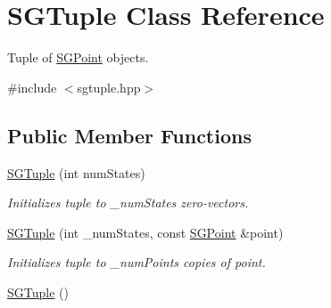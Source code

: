 \hypertarget{classSGTuple}{\section{S\-G\-Tuple Class Reference}
\label{classSGTuple}
}


Tuple of \hyperlink{classSGPoint}{S\-G\-Point} objects.  




{\ttfamily \#include $<$sgtuple.\-hpp$>$}

\subsection*{Public Member Functions}
\begin{DoxyCompactItemize}
\item 
\hypertarget{classSGTuple_a7159656a9fbec24b5b6c94dbfec1ffd1}{\hyperlink{classSGTuple_a7159656a9fbec24b5b6c94dbfec1ffd1}{S\-G\-Tuple} (int num\-States)}\label{classSGTuple_a7159656a9fbec24b5b6c94dbfec1ffd1}

\begin{DoxyCompactList}\small\item\em Initializes tuple to \-\_\-num\-States zero-\/vectors. \end{DoxyCompactList}\item 
\hypertarget{classSGTuple_a37adecb17ef12a7c1a4cb14bb89ce59f}{\hyperlink{classSGTuple_a37adecb17ef12a7c1a4cb14bb89ce59f}{S\-G\-Tuple} (int \-\_\-num\-States, const \hyperlink{classSGPoint}{S\-G\-Point} \&point)}\label{classSGTuple_a37adecb17ef12a7c1a4cb14bb89ce59f}

\begin{DoxyCompactList}\small\item\em Initializes tuple to \-\_\-num\-Points copies of point. \end{DoxyCompactList}\item 
\hypertarget{classSGTuple_a1aacff0823f75661729104f8d232fcbf}{\hyperlink{classSGTuple_a1aacff0823f75661729104f8d232fcbf}{S\-G\-Tuple} ()}\label{classSGTuple_a1aacff0823f75661729104f8d232fcbf}


\end{DoxyCompactItemize}
